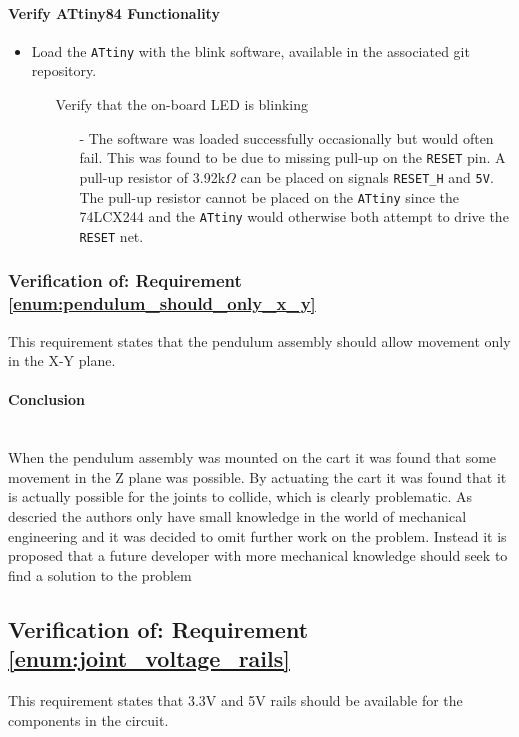 \paragraph{Verify ATtiny84 Functionality} %
\label{par:verify_attiny84_functionality}
\begin{itemize}
	\item Load the \texttt{ATtiny} with the blink software, available in the associated git repository.
	\begin{itemize}
		\item[\xmark] Verify that the on-board LED is blinking
		\begin{itemize}
			\item[-] The software was loaded successfully occasionally but would often fail.
			This was found to be due to missing pull-up on the \texttt{RESET} pin.
			A pull-up resistor of 3.92k$\Omega$ can be placed on signals \texttt{RESET\_H} and \texttt{5V}.
			The pull-up resistor cannot be placed on the \texttt{ATtiny} since the 74LCX244 and the \texttt{ATtiny} would otherwise both attempt to drive the \texttt{RESET} net.
		\end{itemize}
	\end{itemize}
\end{itemize}

\subsubsection{Verification of: Requirement \ref{enum:pendulum_should_only_x_y}} %
\label{ssub:verification_of_requirement_enum:pendulum_should_only_x_y}
This requirement states that the pendulum assembly should allow movement only in the X-Y plane. 

\paragraph{Conclusion}~\\
When the pendulum assembly was mounted on the cart it was found that some movement in the Z plane was possible.
By actuating the cart it was found that it is actually possible for the joints to collide, which is clearly problematic.
As descried the authors only have small knowledge in the world of mechanical engineering and it was decided to omit further work on the problem.
Instead it is proposed that a future developer with more mechanical knowledge should seek to find a solution to the problem 

\subsection{Verification of: Requirement \ref{enum:joint_voltage_rails}} %
\label{sub:verification_of_requirement_enum:joint_voltage_rails}
This requirement states that 3.3V and 5V rails should be available for the components in the circuit.

